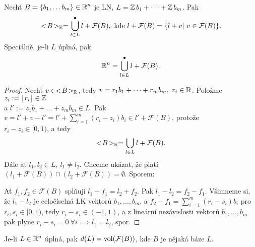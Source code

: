 \begin{lemma}\label{lemma3_35}
Nechť $B = \{b_1,\dots b_m\} \in \operatorname{\mathbb{R}}^n$ je LN, $L = \operatorname{\mathbb{Z}} b_1 + \dots + \operatorname{\mathbb{Z}} b_m$. Pak 
\begin{equation*}
    <\!B\!>_{\operatorname{\mathbb{R}}} = \operatorname*{\overset{\bullet}{\bigcup}}_{l \in L} l + \mathcal{F}(B), \text{ kde } l + \mathcal{F}(B) = \{l + v | \ v \in \mathcal{F}(B)\}.
\end{equation*}
Speciálně, je-li $L$ úplná, pak
\begin{equation*}
    \operatorname{\mathbb{R}}^n = \operatorname*{\overset{\bullet}{\bigcup}}_{l \in L} l + \mathcal{F}(B).
\end{equation*}
\end{lemma}
\begin{proof}
Nechť $v \in <\!B\!>_{\operatorname{\mathbb{R}}}$, tedy $v = r_1 b_1 + \dots + r_m b_m, \ r_i \in \operatorname{\mathbb{R}}$. Položme $z_i := \lfloor r_i \rfloor \in \operatorname{\mathbb{Z}}$\\a $l' := z_1 b_1 + \dots + z_m b_m \in L$. Pak $v = l' + v - l' = l' + \sum_{i=1}^m (r_i - z_i)b_i \in l' + \mathcal{F}(B)$, protože\\$r_i - z_i \in [0,1)$, a tedy $$<\!B\!>_{\operatorname{\mathbb{R}}} = \bigcup_{l \in L} l + \mathcal{F}(B).$$
Dále ať $l_1, l_2 \in L, \ l_1 \neq l_2$. Chceme ukázat, že platí $\left( l_1 + \mathcal{F}(B) \right) \cap \left( l_2 + \mathcal{F}(B) \right) = \emptyset$. Sporem:

Ať $f_1, f_2 \in \mathcal{F}(B)$ splňují $l_1 + f_1 = l_2 + f_2$. Pak $l_1 - l_2 = f_2 - f_1$. Všimneme si, že $l_1 - l_2$ je celočíselná LK vektorů $b_1,\dots,b_m$, a $f_2 - f_1 = \sum_{i=1}^m (r_i - s_i)b_i$ pro $r_i, s_i \in [0,1)$, tedy $r_i - s_i \in (-1,1)$, a z lineární nezávislosti vektorů $b_1,\dots,b_m$ pak plyne $r_i - s_i = 0 \ \forall i \implies l_1 = l_2$, spor.
\end{proof}

\begin{note}
Je-li $L \in \operatorname{\mathbb{R}}^n$ úplná, pak $d(L)=\operatorname{vol}(\mathcal{F}(B))$, kde $B$ je nějaká báze $L$.
\end{note}

